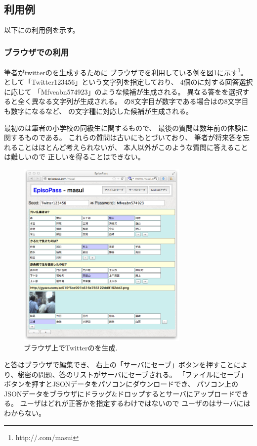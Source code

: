 \documentclass[twoside]{wiss}
\begin{document}
\subsection{{\EP}利用例}

以下に{\EP}の利用例を示す。

\subsubsection{ブラウザでの利用}

筆者がtwitterの{\PW}を生成するために
ブラウザで{\EP}を利用している例を図\ref{web1}に示す\footnote{
  \textsf{http://{\EP}.com/masui}
}。
{\SS}として「\textsf{Twitter123456}」という文字列を指定しており、
4個の{\SQ}に対する回答選択に応じて
「\textsf{Mfveabn574923}」のような{\PW}候補が生成される。
異なる答をを選択すると全く異なる文字列が生成される。
{\SS}の8文字目が数字である場合は{\PW}の8文字目も数字になるなど、
{\SS}の文字種に対応した{\PW}候補が生成される。

最初の{\SQ}は筆者の小学校の同級生に関するもので、
最後の質問は数年前の体験に関するものである。
これらの質問は古い{\EM}にもとづいており、
筆者が将来答を忘れることはほとんど考えられないが、
本人以外がこのような質問に答えることは難しいので
正しい{\PW}を得ることはできない。

\begin{figure}[H]
\centerline{\includegraphics[width=83mm,bb=0 0 718 796]{figures/785ff09b4233804d2ec89c3af71ee5d0.png}}
\caption{ブラウザ上でTwitterの{\PW}を生成.}
\label{web1}
\end{figure}

{\SQ}と答はブラウザで編集でき、
右上の「サーバにセーブ」ボタンを押すことにより{\SS}、秘密の問題、答のリストがサーバにセーブされる。
「ファイルにセーブ」ボタンを押すとJSONデータをパソコンにダウンロードでき、
パソコン上のJSONデータをブラウザにドラッグ\&ドロップするとサーバにアップロードできる。
ユーザはどれが正答かを指定するわけではないので
ユーザの{\PW}はサーバにはわからない。
\end{document}

